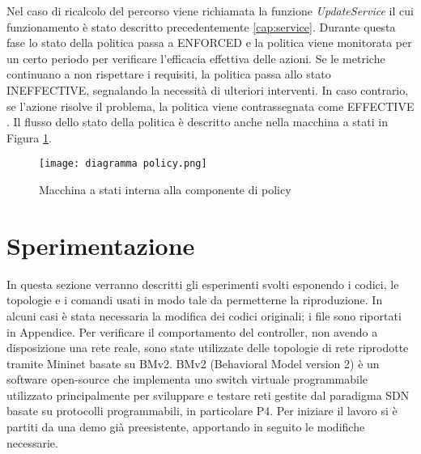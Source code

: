 Nel caso di ricalcolo del percorso viene richiamata la funzione \textit{UpdateService} il cui funzionamento è stato descritto precedentemente \ref{cap:service}.
Durante questa fase lo stato della politica passa a ENFORCED e la politica viene monitorata per un certo periodo per verificare l'efficacia effettiva delle azioni.
Se le metriche continuano a non rispettare i requisiti, la politica passa allo stato INEFFECTIVE, segnalando la necessità di ulteriori interventi.
In caso contrario, se l'azione risolve il problema, la politica viene contrassegnata come EFFECTIVE \cite{D32}.
Il flusso dello stato della politica è descritto anche nella macchina a stati in Figura \ref{fig:diagramma}.
\begin{figure}[h]
    \centering
   \texttt{[image: diagramma policy.png]}
    \caption{Macchina a stati interna alla componente di policy \cite{D32}}
    \label{fig:diagramma}
\end{figure}

\section{Sperimentazione}
In questa sezione verranno descritti gli esperimenti svolti esponendo i codici, le topologie e i comandi usati 
in modo tale da permetterne la riproduzione. In alcuni casi è stata necessaria la modifica dei codici originali; i file sono riportati in Appendice.
\newline Per verificare il comportamento del controller, non avendo a disposizione una rete reale, sono state utilizzate delle topologie
di rete riprodotte tramite Mininet basate su BMv2\cite{bmv2}.
BMv2 (Behavioral Model version 2) è un software open-source che implementa uno switch virtuale programmabile utilizzato principalmente
per sviluppare e testare reti gestite dal paradigma SDN basate su protocolli programmabili, in particolare P4.
\newline Per iniziare il lavoro si è partiti da una demo già preesistente, apportando in seguito le modifiche necessarie.

